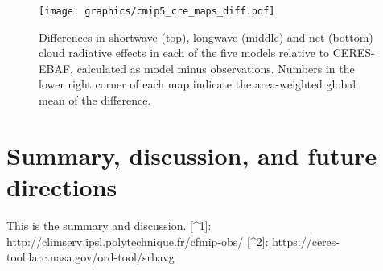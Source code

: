 \begin{figure}[htbp]
\centering
\texttt{[image: graphics/cmip5\_cre\_maps\_diff.pdf]}
\caption{\label{fig:cmip5_cre_maps_diff}Differences in shortwave (top),
longwave (middle) and net (bottom) cloud radiative effects in each of
the five models relative to CERES-EBAF, calculated as model minus
observations. Numbers in the lower right corner of each map indicate the
area-weighted global mean of the
difference.}\label{fig:cmip5ux5fcreux5fmapsux5fdiff}
\end{figure}

\section{Summary, discussion, and future
directions}\label{summary-discussion-and-future-directions}

This is the summary and discussion. {[}\^{}1{]}:
http://climserv.ipsl.polytechnique.fr/cfmip-obs/ {[}\^{}2{]}:
https://ceres-tool.larc.nasa.gov/ord-tool/srbavg
